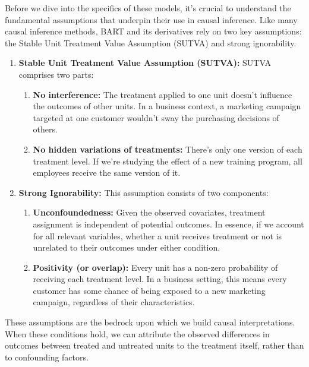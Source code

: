 \documentclass[
  letterpaper,
  DIV=11,
  numbers=noendperiod]{scrreprt}
\begin{document}
Before we dive into the specifics of these models, it's crucial to
understand the fundamental assumptions that underpin their use in causal
inference. Like many causal inference methods, BART and its derivatives
rely on two key assumptions: the Stable Unit Treatment Value Assumption
(SUTVA) and strong ignorability.

\begin{enumerate}
\def\labelenumi{\arabic{enumi}.}
\item
  \textbf{Stable Unit Treatment Value Assumption (SUTVA):} SUTVA
  comprises two parts:

  \begin{enumerate}
  \def\labelenumii{\alph{enumii}.}
  \item
    \textbf{No interference:} The treatment applied to one unit doesn't
    influence the outcomes of other units. In a business context, a
    marketing campaign targeted at one customer wouldn't sway the
    purchasing decisions of others.
  \item
    \textbf{No hidden variations of treatments:} There's only one
    version of each treatment level. If we're studying the effect of a
    new training program, all employees receive the same version of it.
  \end{enumerate}
\item
  \textbf{Strong Ignorability:} This assumption consists of two
  components:

  \begin{enumerate}
  \def\labelenumii{\alph{enumii}.}
  \item
    \textbf{Unconfoundedness:} Given the observed covariates, treatment
    assignment is independent of potential outcomes. In essence, if we
    account for all relevant variables, whether a unit receives
    treatment or not is unrelated to their outcomes under either
    condition.
  \item
    \textbf{Positivity (or overlap):} Every unit has a non-zero
    probability of receiving each treatment level. In a business
    setting, this means every customer has some chance of being exposed
    to a new marketing campaign, regardless of their characteristics.
  \end{enumerate}
\end{enumerate}

These assumptions are the bedrock upon which we build causal
interpretations. When these conditions hold, we can attribute the
observed differences in outcomes between treated and untreated units to
the treatment itself, rather than to confounding factors.
\end{document}
